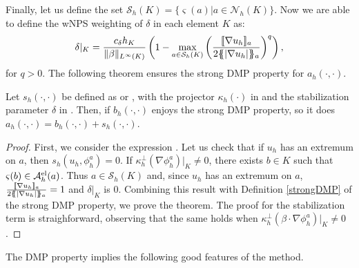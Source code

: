 Finally, let us define the set $\mathcal{S}_h(K) = \{\varsigma(a) | a \in \mathcal{N}_h(K)\}$. Now we are able to define the  wNPS  weighting of $\delta$ in each element $K$ as:
\begin{align}\label{eq-tildeltaSZ}
\delta|_K = \frac{c_\delta h_K}{\|\beta\|_{L^\infty(K)}} \left(1-\max_{a \in \mathcal{S}_h(K)}\left(\frac{ \lbrack\!\lbrack \nabla u_h \rbrack\!\rbrack_a }{2\{\! \!\{ |\nabla u_h|\}\! \!\}_a}\right)^q\right),
\end{align}
for $q>0$. The following theorem ensures the strong DMP property for $a_h(\cdot,\cdot)$.
\begin{theorem}
Let $s_h(\cdot,\cdot)$ be  defined as  or , with the projector $\kappa_h(\cdot)$ in  and the stabilization parameter $\delta$ in . Then, if $b_h(\cdot,\cdot)$ enjoys the strong DMP property, so it does $a_h(\cdot,\cdot) =b_h(\cdot,\cdot) + s_h(\cdot,\cdot)$.
\end{theorem}
\begin{proof}First, we consider the expression . Let us check that if $u_h$ has an extremum on $a$, then ${s}_h(u_h,\phi_h^a) = 0.$ If $\kappa_h^\perp(\nabla \phi^a_h)|_K\neq 0$, there exists $b\in K$ such that $\varsigma (b) \in \mathcal{A}_h^{\rm el}(a)$. Thus $a\in  \mathcal{S}_h(K)$ and, since $u_h$ has an extremum on $a$,  $  \frac{ \lbrack\!\lbrack \nabla u_h  \rbrack\!\rbrack_a }{  2\{\! \!\{ |\nabla u_h|\}\! \!\}_a}=1$ and  $\delta|_K$ is $ 0$. Combining this result with Definition \ref{strongDMP} of the strong DMP property, we prove the theorem. The proof for the stabilization term  is straighforward, observing that the same holds when $\kappa_h^\perp( \beta \cdot \nabla \phi^a_h)|_K\neq 0$.
\end{proof}


The DMP property implies the following good features of the method.

